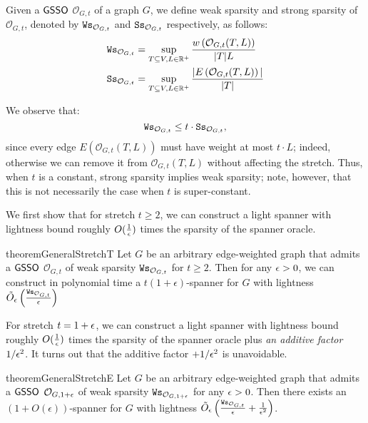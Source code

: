 \begin{definition}[Sparsity]\label{def:sparsity} Given a $\mathsf{GSSO}$ $\mathcal{O}_{G,t}$ of a graph $G$, we define weak sparsity and strong sparsity of $\mathcal{O}_{G,t}$, denoted by $\mathtt{Ws}_{\mathcal{O}_{G,t}}$ and $\mathtt{Ss}_{\mathcal{O}_{G,t}}$ respectively, as follows:
	\begin{equation}\label{eq:wsp-ssp}
		\begin{split}
			\mathtt{Ws}_{\mathcal{O}_{G,t}} &= \sup_{T\subseteq V, L \in \mathbb{R}^+}\frac{w\left(\mathcal{O}_{G,t}(T,L)\right)}{|T|L}\\
			\mathtt{Ss}_{\mathcal{O}_{G,t}} &=  \sup_{T\subseteq V, L \in \mathbb{R}^+} \frac{|E\left( \mathcal{O}_{G,t}(T,L)\right)|}{|T|}
		\end{split}
	\end{equation}	
\end{definition}
\noindent We observe that:
\begin{equation}\label{wsp-vs-ssp}
	\mathtt{Ws}_{\mathcal{O}_{G,t}} \leq t\cdot \mathtt{Ss}_{\mathcal{O}_{G,t}},
\end{equation}
since every edge $E\left( \mathcal{O}_{G,t}(T,L)\right)$ must have weight at most $t\cdot L$; indeed, otherwise we can remove it from $ \mathcal{O}_{G,t}(T,L)$ without affecting the stretch.  Thus, when $t$ is a constant, strong sparsity implies weak sparsity; note, however, that this is not necessarily the case when $t$ is super-constant. 


We first show that for stretch $t\geq 2$, we can construct a light spanner with lightness bound roughly $O(\frac{1}{\epsilon})$ times the sparsity of the spanner oracle. 



\begin{restatable}{theorem}{GeneralStretchT}
	\label{thm:general-stretch-2} Let $G$ be an arbitrary edge-weighted graph that admits a $\mathsf{GSSO}$ $\mathcal{O}_{G,t}$ of weak sparsity $\mathtt{Ws}_{\mathcal{O}_{G,t}}$ for $t\geq 2$. Then for any $\epsilon > 0$, we can construct in polynomial time a $t(1+\epsilon)$-spanner for $G$ with lightness $\tilde{O}_{\epsilon}\left(\frac{\mathtt{Ws}_{\mathcal{O}_{G,t}}}{\epsilon}\right)$
\end{restatable}


For stretch $t = 1+\epsilon$, we can construct a light spanner with lightness bound roughly $O(\frac{1}{\epsilon})$ times the sparsity of the spanner oracle plus \emph{an additive factor $1/\epsilon^2$}. It turns out that the additive factor $+1/\epsilon^2$ is unavoidable.

\begin{restatable}{theorem}{GeneralStretchE}
	\label{thm:general-stretch-1eps} Let $G$ be an arbitrary edge-weighted graph  that admits a $\mathsf{GSSO}$ $\mathcal{O}_{G,1+\epsilon}$ of weak sparsity $\mathtt{Ws}_{\mathcal{O}_{G,1+\epsilon}}$  for any $\epsilon > 0$. Then there exists an $(1+O(\epsilon))$-spanner for $G$ with lightness $\tilde{O}_{\epsilon}\left(\frac{\mathtt{Ws}_{\mathcal{O}_{G,t}}}{\epsilon} + \frac{1}{\epsilon^2}\right)$.
\end{restatable}

